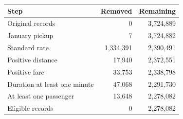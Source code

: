 \begin{tabular}{lrr}
\toprule
Step & Removed & Remaining \\
\midrule
Original records & 0 & 3,724,889 \\
January pickup & 7 & 3,724,882 \\
Standard rate & 1,334,391 & 2,390,491 \\
Positive distance & 17,940 & 2,372,551 \\
Positive fare & 33,753 & 2,338,798 \\
Duration at least one minute & 47,068 & 2,291,730 \\
At least one passenger & 13,648 & 2,278,082 \\
Eligible records & 0 & 2,278,082 \\
\bottomrule
\end{tabular}
